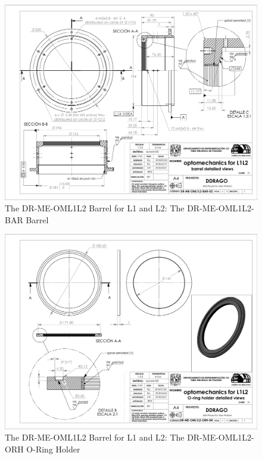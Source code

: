 \documentclass{article}
\begin{document}
\begin{figure}
\begin{center}
\includegraphics[height=\linewidth,angle=90]{figures/DR-ME-OML1L2-BAR-03}
\end{center}
\caption{The DR-ME-OML1L2 Barrel for L1 and L2: The DR-ME-OML1L2-BAR Barrel}
\label{figure:rosalia-oml1l2-bar}
\end{figure}

\begin{figure}
\begin{center}
\includegraphics[height=\linewidth,angle=90]{figures/DR-ME-OML1L2-ORH-04}
\end{center}
\caption{The DR-ME-OML1L2 Barrel for L1 and L2: The DR-ME-OML1L2-ORH O-Ring Holder}
\label{figure:rosalia-oml1l2-orh}
\end{figure}
\end{document}
